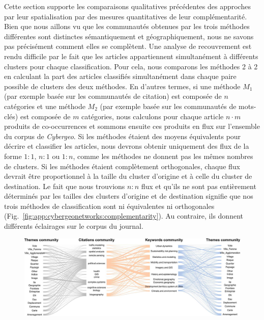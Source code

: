 {Cette section supporte les comparaisons qualitatives précédentes des approches par leur spatialisation par des mesures quantitatives de leur complémentarité. Bien que nous aillons vu que les communautés obtenues par les trois méthodes différentes sont distinctes sémantiquement et géographiquement, nous ne savons pas précisément comment elles se complètent. Une analyse de recouvrement est rendu difficile par le fait que les articles appartiennent simultanément à différents clusters pour chaque classification. Pour cela, nous comparons les méthodes 2 à 2 en calculant la part des articles classifiés simultanément dans chaque paire possible de clusters des deux méthodes. En d'autres termes, si une méthode $M_1$ (par exemple basée sur les communautés de citation) est composée de $n$ catégories et une méthode $M_2$ (par exemple basée sur les communautés de mots-clés) est composée de $m$ catégories, nous calculons pour chaque article $n\cdot m$ produits de co-occurrences et sommons ensuite ces produits en flux sur l'ensemble du corpus de \textit{Cybergeo}. Si les méthodes étaient des moyens équivalents pour décrire et classifier les articles, nous devrons obtenir uniquement des flux de la forme $1:1$, $n:1$ ou $1:n$, comme les méthodes ne donnent pas les mêmes nombres de clusters. Si les méthodes étaient complètement orthogonales, chaque flux devrait être proportionnel à la taille du cluster d'origine et à celle du cluster de destination. Le fait que nous trouvions $n:n$ flux et qu'ils ne sont pas entièrement déterminés par les tailles des clusters d'origine et de destination signifie que nos trois méthodes de classification sont ni équivalentes ni orthogonales (Fig.~\ref{fig:app:cybergeonetworks:complementarity}). Au contraire, ils donnent différents éclairages sur le corpus du journal.
}


\begin{figure}%
\includegraphics[width=\linewidth]{Figures/Final/C-cybergeonetworks-complementarity.jpg}
\end{figure}



